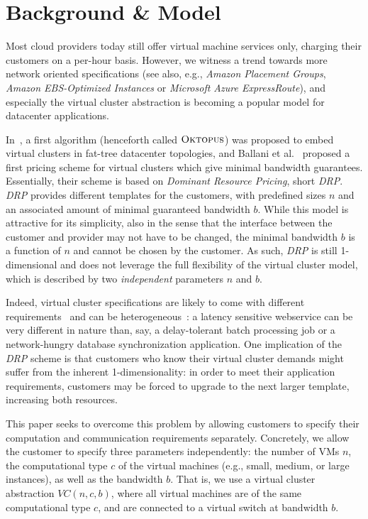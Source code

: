 \documentclass{sig-alternate-per}
\newcommand{\OKTO}{\textsc{Oktopus}}
\begin{document}
\section{Background \& Model}\label{sec:model}

Most cloud providers today still offer virtual machine services only,
charging their customers on a per-hour basis.
However, we witness a trend towards more network oriented specifications
(see also, e.g., \emph{Amazon Placement Groups}, \emph{Amazon EBS-Optimized Instances} or \emph{Microsoft Azure ExpressRoute}),
and especially the virtual cluster abstraction is becoming a
popular model for datacenter applications.~\cite{short-ballani2011towards}

In~\cite{short-ballani2011towards}, a first algorithm (henceforth called $\OKTO$) was proposed
to embed virtual clusters in fat-tree datacenter topologies,
and Ballani et al.~\cite{short-ballani2011price} proposed a first pricing scheme
for virtual clusters which give minimal bandwidth guarantees.
Essentially, their scheme is based on \emph{Dominant Resource Pricing}, short \emph{DRP}.
\emph{DRP} provides different templates for the customers, with predefined sizes $n$ and
an associated amount of minimal guaranteed bandwidth $b$.
While this model is attractive for its simplicity,
also in the sense that the interface between the customer and provider may not have to be changed,
the minimal bandwidth $b$ is a function of $n$ and cannot be chosen by the customer.
As such, \emph{DRP} is still 1-dimensional and does not leverage the full flexibility of the virtual cluster model,
which is described by two
\emph{independent} parameters $n$ and $b$.

Indeed, virtual cluster specifications are likely to come with different requirements~\cite{short-mesos}
and can be heterogeneous~\cite{short-talk-about}: a latency sensitive webservice
can be very different in nature than, say, a delay-tolerant batch processing job or a network-hungry database synchronization application.
One implication of the \emph{DRP} scheme is that customers who know their virtual cluster demands might suffer
from the inherent 1-dimensionality: in order to meet their application requirements,
customers may be forced to upgrade to the next larger template, increasing both resources.

This paper seeks to overcome this problem by allowing customers to specify their computation
and communication requirements separately.
Concretely, we allow the customer to specify three parameters independently:
the number of VMs $n$, the computational type $c$ of the virtual machines (e.g., small, medium, or large instances),
as well as the bandwidth $b$. That is, we use a virtual cluster abstraction $VC(n,c,b)$,
where all virtual machines are of the same computational type $c$, and are connected to a virtual switch at bandwidth $b$.
\end{document}
